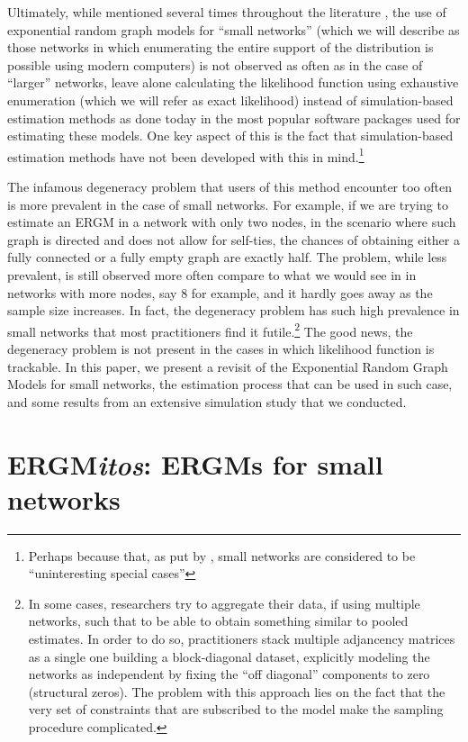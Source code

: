 \documentclass[12pt]{article}
\begin{document}
Ultimately, while mentioned several times throughout the literature \cite{Wasserman1996,Frank1986,Snijders2011}, the use of exponential random graph models for ``small networks'' (which we will describe as those networks in which enumerating the entire support of the distribution is possible using modern computers) is not observed as often as in the case of ``larger'' networks, leave alone calculating the likelihood function using exhaustive enumeration (which we will refer as exact likelihood) instead of simulation-based estimation methods as done today in the most popular software packages used for estimating these models. One key aspect of this is the fact that simulation-based estimation methods have not been developed with this in mind.\footnote{Perhaps because that, as put by \cite{Snijders2011}, small networks are considered to be ``uninteresting special cases''}

The infamous degeneracy problem \cite{Handcock2003} that users of this method encounter too often is more prevalent in the case of small networks. For example, if we are trying to estimate an ERGM in a network with only two nodes, in the scenario where such graph is directed and does not allow for self-ties, the chances of obtaining either a fully connected or a fully empty graph are exactly half. The problem, while less prevalent, is still observed more often compare to what we would see in in networks with more nodes, say 8 for example, and it hardly goes away as the sample size increases. In fact, the degeneracy problem has such high prevalence in small networks that most practitioners find it futile.\footnote{In some cases, researchers try to aggregate their data, if using multiple networks, such that to be able to obtain something similar to pooled estimates. In order to do so, practitioners stack multiple adjancency matrices as a single one building a block-diagonal dataset, explicitly modeling the networks as independent by fixing the ``off diagonal'' components to zero (structural zeros). The problem with this approach lies on the fact that the very set of constraints that are subscribed to the model make the sampling procedure complicated.} The good news, the degeneracy problem is not present in the cases in which likelihood function is trackable. In this paper, we present a revisit of the Exponential Random Graph Models for small networks, the estimation process that can be used in such case, and some results from an extensive simulation study that we conducted.

\section{ERGM{\it{}itos}: ERGMs for small networks}
\end{document}
